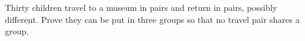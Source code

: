 Thirty children travel to a museum in pairs and return in pairs, possibly different. Prove they can be put in three groups so that no travel pair shares a group.
